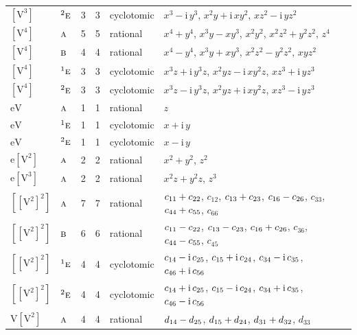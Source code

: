 \documentclass[10pt,a4paper]{article}
\numberwithin{equation}{section}
\newcommand{\irr}[1]{\text{\normalfont\scshape #1}}
\newcommand{\conjpair}[1]{{}^{#1}}
\newcommand{\iunit}{\mathrm{i}}
\newcommand{\jahn}[1]{\mathrm{#1}}
\newlength{\fillwidth}\newlength{\cellwidth}\newlength{\colwidth}
\newcommand{\signbreak}{\penalty100\relax}
\begin{document}
{\begin{longtable}{@{}llrrl>{\RaggedRight\arraybackslash}p{\fillwidth}@{}}
$\jahn{[V^{3}]}$ & $\conjpair{2}\irr{e}$ & 3 & 3 & cyclotomic & $x^{3} - \iunit{}\,y^{3}$, $x^{2}y + \iunit{}\,xy^{2}$, $xz^{2} - \iunit{}\,yz^{2}$\\
$\jahn{[V^{4}]}$ & $\irr{a}$ & 5 & 5 & rational & $x^{4} + y^{4}$, $x^{3}y - xy^{3}$, $x^{2}y^{2}$, $x^{2}z^{2} + y^{2}z^{2}$, $z^{4}$\\
$\jahn{[V^{4}]}$ & $\irr{b}$ & 4 & 4 & rational & $x^{4} - y^{4}$, $x^{3}y + xy^{3}$, $x^{2}z^{2} - y^{2}z^{2}$, $xyz^{2}$\\
$\jahn{[V^{4}]}$ & $\conjpair{1}\irr{e}$ & 3 & 3 & cyclotomic & $x^{3}z + \iunit{}\,y^{3}z$, $x^{2}yz - \iunit{}\,xy^{2}z$, $xz^{3} + \iunit{}\,yz^{3}$\\
$\jahn{[V^{4}]}$ & $\conjpair{2}\irr{e}$ & 3 & 3 & cyclotomic & $x^{3}z - \iunit{}\,y^{3}z$, $x^{2}yz + \iunit{}\,xy^{2}z$, $xz^{3} - \iunit{}\,yz^{3}$\\
$\jahn{eV}$ & $\irr{a}$ & 1 & 1 & rational & $z$\\
$\jahn{eV}$ & $\conjpair{1}\irr{e}$ & 1 & 1 & cyclotomic & $x + \iunit{}\,y$\\
$\jahn{eV}$ & $\conjpair{2}\irr{e}$ & 1 & 1 & cyclotomic & $x - \iunit{}\,y$\\
$\jahn{e[V^{2}]}$ & $\irr{a}$ & 2 & 2 & rational & $x^{2} + y^{2}$, $z^{2}$\\
$\jahn{e[V^{3}]}$ & $\irr{a}$ & 2 & 2 & rational & $x^{2}z + y^{2}z$, $z^{3}$\\
$\jahn{[[V^{2}]^{2}]}$ & $\irr{a}$ & 7 & 7 & rational & $c_{11} +\signbreak c_{22}$, $c_{12}$, $c_{13} +\signbreak c_{23}$, $c_{16} -\signbreak c_{26}$, $c_{33}$, $c_{44} +\signbreak c_{55}$, $c_{66}$\\
$\jahn{[[V^{2}]^{2}]}$ & $\irr{b}$ & 6 & 6 & rational & $c_{11} -\signbreak c_{22}$, $c_{13} -\signbreak c_{23}$, $c_{16} +\signbreak c_{26}$, $c_{36}$, $c_{44} -\signbreak c_{55}$, $c_{45}$\\
$\jahn{[[V^{2}]^{2}]}$ & $\conjpair{1}\irr{e}$ & 4 & 4 & cyclotomic & $c_{14} -\signbreak \iunit{}\,c_{25}$, $c_{15} +\signbreak \iunit{}\,c_{24}$, $c_{34} -\signbreak \iunit{}\,c_{35}$, $c_{46} +\signbreak \iunit{}\,c_{56}$\\
$\jahn{[[V^{2}]^{2}]}$ & $\conjpair{2}\irr{e}$ & 4 & 4 & cyclotomic & $c_{14} +\signbreak \iunit{}\,c_{25}$, $c_{15} -\signbreak \iunit{}\,c_{24}$, $c_{34} +\signbreak \iunit{}\,c_{35}$, $c_{46} -\signbreak \iunit{}\,c_{56}$\\
$\jahn{V[V^{2}]}$ & $\irr{a}$ & 4 & 4 & rational & $d_{14} -\signbreak d_{25}$, $d_{15} +\signbreak d_{24}$, $d_{31} +\signbreak d_{32}$, $d_{33}$\\

\end{longtable}}
\end{document}
